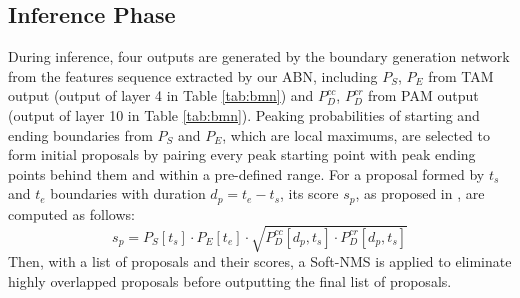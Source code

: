\documentclass{ieeeaccess}
\begin{document}
\subsection{Inference Phase}
During inference, four outputs are generated by the boundary generation network from the features sequence extracted by our ABN, including $P_S$, $P_E$ from TAM output (output of layer 4 in Table \ref{tab:bmn}) and $P^{cc}_D$, $P^{cr}_D$ from PAM output (output of layer 10 in Table \ref{tab:bmn}). Peaking probabilities of starting and ending boundaries from $P_S$ and $P_E$, which are local maximums, are selected to form initial proposals by pairing every peak starting point with peak ending points behind them and within a pre-defined range. For a proposal formed by $t_s$ and $t_e$ boundaries with duration $d_p = t_e - t_s$, its score $s_p$, as proposed in \cite{bmn}, are computed as follows:
\begin{equation}
    s_{p} = P_S[t_s] \cdot P_E[t_e] \cdot \sqrt{P^{cc}_D[d_p, t_s] \cdot P^{cr}_D[d_p, t_s]}
\end{equation}
Then, with a list of proposals and their scores, a Soft-NMS \cite{SoftNMS} is applied to eliminate highly overlapped proposals before outputting the final list of proposals.
\end{document}
